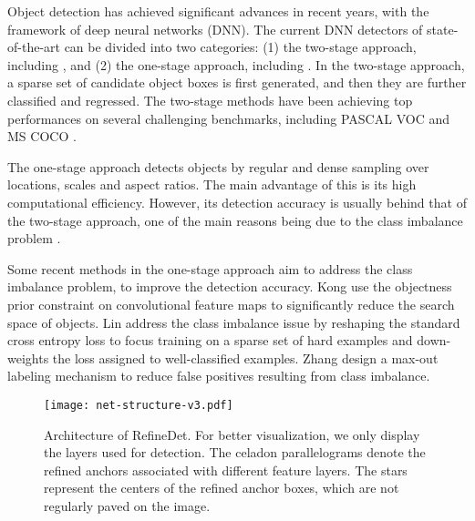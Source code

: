 \documentclass[10pt,twocolumn,letterpaper]{article}
\begin{document}
Object detection has achieved significant advances in recent years, with the framework of deep neural networks (DNN). The current DNN detectors of state-of-the-art can be divided into two categories: (1) the two-stage approach, including \cite{DBLP:conf/eccv/CaiFFV16,DBLP:conf/iccv/Girshick15,DBLP:journals/pami/RenHG017,DBLP:conf/cvpr/ShrivastavaGG16}, and (2) the one-stage approach, including \cite{DBLP:conf/eccv/LiuAESRFB16, DBLP:journals/corr/RedmonF16}. In the two-stage approach, a sparse set of candidate object boxes is first generated, and then they are further classified and regressed. The two-stage methods have been achieving top performances on several challenging benchmarks, including PASCAL VOC \cite{DBLP:journals/ijcv/EveringhamGWWZ10} and MS COCO \cite{DBLP:conf/eccv/LinMBHPRDZ14}.

The one-stage approach detects objects by regular and dense sampling over locations, scales and aspect ratios. The main advantage of this is its high computational efficiency. However, its detection accuracy is usually behind that of the two-stage approach, one of the main reasons being due to the class imbalance problem \cite{DBLP:conf/iccv/LinPRK17}.

Some recent methods in the one-stage approach aim to address the class imbalance problem, to improve the detection accuracy. Kong \etal \cite{DBLP:conf/cvpr/KongSYLLC17} use the objectness prior constraint on convolutional feature maps to significantly reduce the search space of objects. Lin \etal \cite{DBLP:conf/iccv/LinPRK17} address the class imbalance issue by reshaping the standard cross entropy loss to focus training on a sparse set of hard examples and down-weights the loss assigned to well-classified examples. Zhang \etal \cite{DBLP:conf/iccv/abs-1708-05237} design a max-out labeling mechanism to reduce false positives resulting from class imbalance.

\begin{figure*}[t]
\centering
\texttt{[image: net-structure-v3.pdf]}
\vspace{-2mm}
\caption{Architecture of RefineDet. For better visualization, we only display the layers used for detection. The celadon parallelograms denote the refined anchors associated with different feature layers. The stars represent the centers of the refined anchor boxes, which are not regularly paved on the image.}
\label{fig:net-structure}
\end{figure*}
\end{document}
